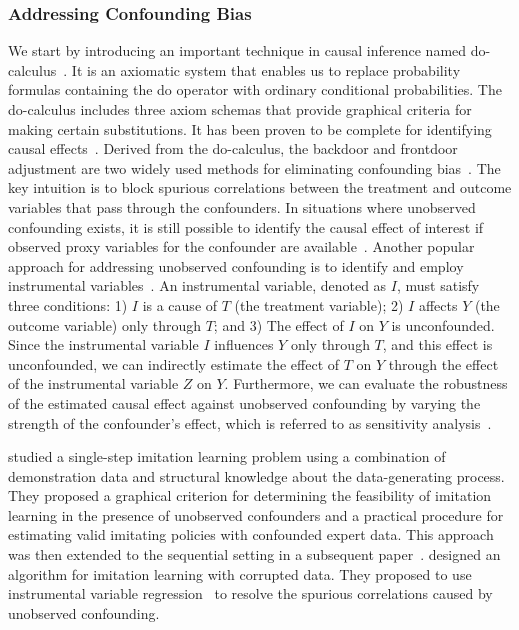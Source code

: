 \documentclass[10pt]{article} %
\theoremstyle{definition}
\begin{document}
\subsubsection{Addressing Confounding Bias} 
We start by introducing an important technique in causal inference named do-calculus~\citep{pearlCausalDiagramsEmpirical1995}. It is an axiomatic system that enables us to replace probability formulas containing the do operator with ordinary conditional probabilities. The do-calculus includes three axiom schemas that provide graphical criteria for making certain substitutions. It has been proven to be complete for identifying causal effects~\citep{huangPearlCalculusIntervention2006,shpitserIdentificationJointInterventional2006}. Derived from the do-calculus, the backdoor and frontdoor adjustment are two widely used methods for eliminating confounding bias~\citet{glymourCausalInferenceStatistics2016,bareinboimPearlHierarchyFoundations2022}. The key intuition is to block spurious correlations between the treatment and outcome variables that pass through the confounders.
In situations where unobserved confounding exists, it is still possible to identify the causal effect of interest if observed proxy variables for the confounder are available~\citep{miaoIdentifyingCausalEffects2018,ghassamiPartialIdentificationCausal2023}.
Another popular approach for addressing unobserved confounding is to identify and employ instrumental variables~\citep{angristIdentificationCausalEffects1996,baiocchiInstrumentalVariableMethods2014}. 
An instrumental variable, denoted as $I$, must satisfy three conditions: 1) $I$ is a cause of $T$ (the treatment variable); 2) $I$ affects $Y$ (the outcome variable) only through $T$; and 3) The effect of $I$ on $Y$ is unconfounded. Since the instrumental variable $I$ influences $Y$ only through $T$, and this effect is unconfounded, we can indirectly estimate the effect of $T$ on $Y$ through the effect of the instrumental variable $Z$ on $Y$. 
Furthermore, we can evaluate the robustness of the estimated causal effect against unobserved confounding by varying the strength of the confounder's effect, which is referred to as sensitivity analysis~\citep{diazSensitivityAnalysisCausal2013,kuangCausalInference2020}.

\citet{zhangCausalImitationLearning2020a} studied a single-step imitation learning problem using a combination of demonstration data and structural knowledge about the data-generating process. They proposed a graphical criterion for determining the feasibility of imitation learning in the presence of unobserved confounders and a practical procedure for estimating valid imitating policies with confounded expert data. This approach was then extended to the sequential setting in a subsequent paper~\citep{kumorSequentialCausalImitation2021a}. 
\citet{swamyCausalImitationLearning2022a} designed an algorithm for imitation learning with corrupted data. They proposed to use instrumental variable regression~\citep{stockRetrospectivesWhoInvented2003} to resolve the spurious correlations caused by unobserved confounding.
\end{document}
